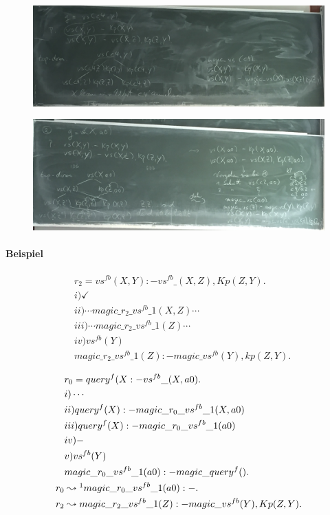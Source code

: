 \documentclass[12pt, a4paper]{article}
\begin{document}
\begin{figure}[h!]
\centering
\includegraphics[width=0.95\linewidth]{img/img13}
\caption{}
\label{fig:img13}
\end{figure}

\begin{figure}[h!]
\centering
\includegraphics[width=0.95\linewidth]{img/img14}
\caption{}
\label{fig:img14}
\end{figure}

\paragraph{Beispiel}

\begin{align*}
&r_2 = vs^{fb}(X,Y) :- vs^{fb}\_(X,Z), Kp(Z,Y). \\
&i) \checkmark \\
&ii) \cdots magic\_r_2\_vs^{fb}\_1(X,Z) \cdots \\
&iii) \cdots magic\_r_2\_vs^{fb}\_1(Z) \cdots \\
&iv) vs^{fb}(Y)\\
& magic\_r_2\_vs^{fb}\_1(Z) :- magic\_vs^{fb}(Y), kp(Z,Y).
\end{align*}


\begin{align*}
&r_0 = query^f(X :- vs^{fb}\_(X,a0). \\
&i) \cdots \\
&ii) query^f(X) :- magic\_r_0\_vs^{fb}\_1(X,a0) \\
&iii) query^f(X) :- magic\_r_0\_vs^{fb}\_1(a0) \\
&iv) - \\
&v) vs^{fb}(Y)\\
& magic\_r_0\_vs^{fb}\_1(a0) :- magic\_query^f().\\
r_0 &\leadsto\footnotemark magic\_r_0\_vs^{fb}\_1(a0) :- . \\
r_2 &\leadsto magic\_r_2\_vs^{fb}\_1(Z) :- magic\_vs^{fb}(Y), Kp(Z,Y).
\end{align*}
\end{document}
